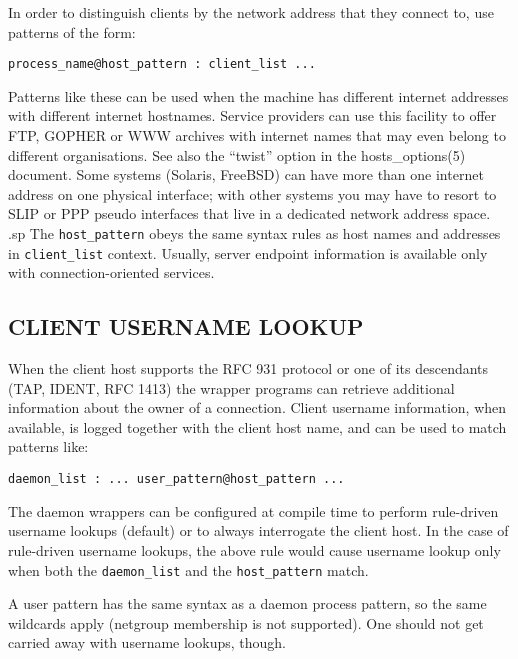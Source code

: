 \documentclass[11pt,twoside,onecolumn]{book}
\begin{document}
In order to distinguish clients by the network address that they
connect to, use patterns of the form:

{\tt process\_name@host\_pattern : client\_list ... }

Patterns like these can be used when the machine has different internet
addresses with different internet hostnames.  Service providers can use
this facility to offer FTP, GOPHER or WWW archives with internet names
that may even belong to different organisations. See also the ``twist''
option in the hosts\_options(5) document. Some systems (Solaris,
FreeBSD) can have more than one internet address on one physical
interface; with other systems you may have to resort to SLIP or PPP
pseudo interfaces that live in a dedicated network address space.
.sp
The {\tt host\_pattern} obeys the same syntax rules as host names and
addresses in {\tt client\_list} context. Usually, server endpoint information
is available only with connection-oriented services.


\subsection*{CLIENT USERNAME LOOKUP}

When the client host supports the RFC 931 protocol or one of its
descendants (TAP, IDENT, RFC 1413) the wrapper programs can retrieve
additional information about the owner of a connection. Client username
information, when available, is logged together with the client host
name, and can be used to match patterns like:

{\tt daemon\_list : ... user\_pattern@host\_pattern ...}

The daemon wrappers can be configured at compile time to perform
rule-driven username lookups (default) or to always interrogate the
client host.  In the case of rule-driven username lookups, the above
rule would cause username lookup only when both the {\tt daemon\_list}
and the {\tt host\_pattern} match. 

A user pattern has the same syntax as a daemon process pattern, so the
same wildcards apply (netgroup membership is not supported).  One
should not get carried away with username lookups, though.
\end{document}
